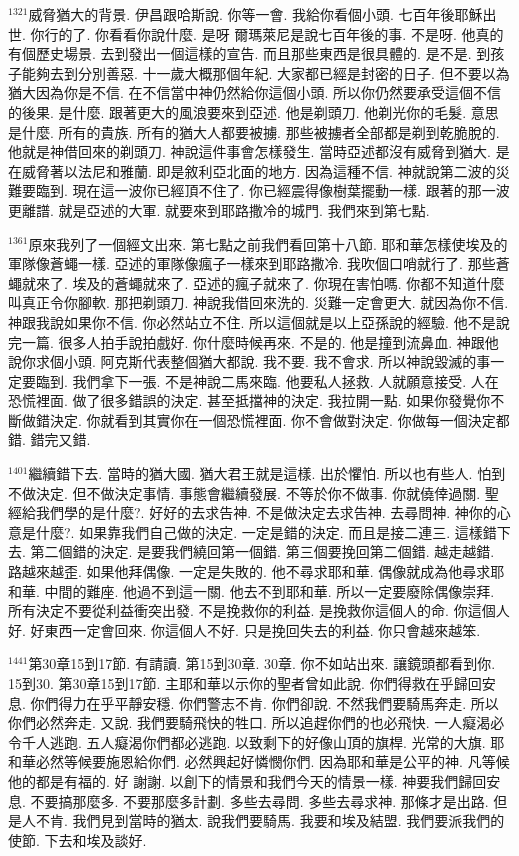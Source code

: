 \documentclass{book}
\begin{document}
$^{1321}$威脅猶大的背景.
伊昌跟哈斯說.
你等一會.
我給你看個小頭.
七百年後耶穌出世.
你行的了.
你看看你說什麼.
是呀 爾瑪萊尼是說七百年後的事.
不是呀.
他真的有個歷史場景.
去到發出一個這樣的宣告.
而且那些東西是很具體的.
是不是.
到孩子能夠去到分別善惡.
十一歲大概那個年紀.
大家都已經是封密的日子.
但不要以為猶大因為你是不信.
在不信當中神仍然給你這個小頭.
所以你仍然要承受這個不信的後果.
是什麼.
跟著更大的風浪要來到亞述.
他是剃頭刀.
他剃光你的毛髮.
意思是什麼.
所有的貴族.
所有的猶大人都要被擄.
那些被擄者全部都是剃到乾脆脫的.
他就是神借回來的剃頭刀.
神說這件事會怎樣發生.
當時亞述都沒有威脅到猶大.
是在威脅著以法尼和雅蘭.
即是敘利亞北面的地方.
因為這種不信.
神就說第二波的災難要臨到.
現在這一波你已經頂不住了.
你已經震得像樹葉擺動一樣.
跟著的那一波更離譜.
就是亞述的大軍.
就要來到耶路撒冷的城門.
我們來到第七點.

$^{1361}$原來我列了一個經文出來.
第七點之前我們看回第十八節.
耶和華怎樣使埃及的軍隊像蒼蠅一樣.
亞述的軍隊像瘋子一樣來到耶路撒冷.
我吹個口哨就行了.
那些蒼蠅就來了.
埃及的蒼蠅就來了.
亞述的瘋子就來了.
你現在害怕嗎.
你都不知道什麼叫真正令你腳軟.
那把剃頭刀.
神說我借回來洗的.
災難一定會更大.
就因為你不信.
神跟我說如果你不信.
你必然站立不住.
所以這個就是以上亞孫說的經驗.
他不是說完一篇.
很多人拍手說拍戲好.
你什麼時候再來.
不是的.
他是撞到流鼻血.
神跟他說你求個小頭.
阿克斯代表整個猶大都說.
我不要.
我不會求.
所以神說毀滅的事一定要臨到.
我們拿下一張.
不是神說二馬來臨.
他要私人拯救.
人就願意接受.
人在恐慌裡面.
做了很多錯誤的決定.
甚至抵擋神的決定.
我拉開一點.
如果你發覺你不斷做錯決定.
你就看到其實你在一個恐慌裡面.
你不會做對決定.
你做每一個決定都錯.
錯完又錯.

$^{1401}$繼續錯下去.
當時的猶大國.
猶大君王就是這樣.
出於懼怕.
所以也有些人.
怕到不做決定.
但不做決定事情.
事態會繼續發展.
不等於你不做事.
你就僥倖過關.
聖經給我們學的是什麼?.
好好的去求告神.
不是做決定去求告神.
去尋問神.
神你的心意是什麼?.
如果靠我們自己做的決定.
一定是錯的決定.
而且是接二連三.
這樣錯下去.
第二個錯的決定.
是要我們繞回第一個錯.
第三個要挽回第二個錯.
越走越錯.
路越來越歪.
如果他拜偶像.
一定是失敗的.
他不尋求耶和華.
偶像就成為他尋求耶和華.
中間的難座.
他過不到這一關.
他去不到耶和華.
所以一定要廢除偶像崇拜.
所有決定不要從利益衝突出發.
不是挽救你的利益.
是挽救你這個人的命.
你這個人好.
好東西一定會回來.
你這個人不好.
只是挽回失去的利益.
你只會越來越笨.

$^{1441}$第30章15到17節.
有請讀.
第15到30章.
30章.
你不如站出來.
讓鏡頭都看到你.
15到30.
第30章15到17節.
主耶和華以示你的聖者曾如此說.
你們得救在乎歸回安息.
你們得力在乎平靜安穩.
你們警志不肯.
你們卻說.
不然我們要騎馬奔走.
所以你們必然奔走.
又說.
我們要騎飛快的牲口.
所以追趕你們的也必飛快.
一人癡渴必令千人逃跑.
五人癡渴你們都必逃跑.
以致剩下的好像山頂的旗桿.
光常的大旗.
耶和華必然等候要施恩給你們.
必然興起好憐憫你們.
因為耶和華是公平的神.
凡等候他的都是有福的.
好 謝謝.
以創下的情景和我們今天的情景一樣.
神要我們歸回安息.
不要搞那麼多.
不要那麼多計劃.
多些去尋問.
多些去尋求神.
那條才是出路.
但是人不肯.
我們見到當時的猶太.
說我們要騎馬.
我要和埃及結盟.
我們要派我們的使節.
下去和埃及談好.
\end{document}
